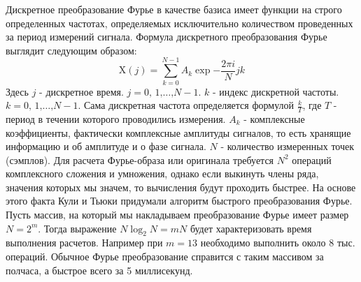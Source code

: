 Дискретное преобразование Фурье в качестве базиса имеет функции на строго определенных частотах, определяемых исключительно количеством проведенных за период измерений сигнала.
Формула дискретного преобразования Фурье выглядит следующим образом:
\begin{equation}
    \mathrm{X}(j) = \sum \limits_{k = 0}^{N-1}A_k\exp{-\frac{2\pi i }{N}jk}
\end{equation}
Здесь $j$ - дискретное время. $j = 0\text{, }1\text{,}\ldots\text{,}N-1$.
$k$ - индекс дискретной частоты. $k = 0\text{, }1\text{,}\ldots\text{,}N-1$. Сама дискретная частота определяется формулой $\frac{k}{T}$, где $T$ - период в течении которого проводились измерения. $A_k$ - комплексные коэффициенты, фактически комплексные амплитуды сигналов, то есть хранящие информацию и об амплитуде и о фазе сигнала. $N$ - количество измеренных точек (сэмплов). Для расчета Фурье-образа или оригинала требуется $N^2$ операций комплексного сложения и умножения, однако если выкинуть члены ряда, значения которых мы значем, то вычисления будут проходить быстрее. На основе этого факта Кули и Тьюки придумали алгоритм быстрого преобразования Фурье. Пусть массив, на который мы накладываем преобразование Фурье имеет размер $N = 2^m$. Тогда выражение $N\log_2 N = mN$ будет характеризовать время выполнения расчетов. Например при $m =13$ необходимо выполнить около 8 тыс. операций. Обычное Фурье преобразование справится с таким массивом за полчаса, а быстрое всего за 5 миллисекунд. 
